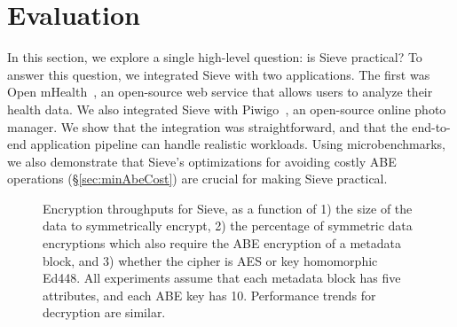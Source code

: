 \chapter{Evaluation}
\label{sec:evaluation}

In this section, we explore a single
high-level question: is Sieve practical?
To answer this question, we integrated
Sieve with two applications. The first
was Open mHealth~\cite{omh}, an open-source
web service that allows users to analyze
their health data. We also integrated Sieve
with Piwigo~\cite{piwigo}, an open-source
online photo manager. We show that the
integration was straightforward, and that
the end-to-end application pipeline can
handle realistic workloads. Using
microbenchmarks, we also demonstrate that
Sieve's optimizations for avoiding costly
ABE operations (\S\ref{sec:minAbeCost})
are crucial for making Sieve practical.

\begin{figure}
\centering
    \caption[ABE throughputs for Sieve]{Encryption throughputs for Sieve, as a function of 1) the size of
             the data to symmetrically encrypt, 2) the percentage of symmetric
             data encryptions which also require the ABE encryption of a
             metadata block, and 3) whether the cipher is AES or
             key homomorphic Ed448. All experiments assume that each metadata
             block has five attributes, and each ABE key has 10. Performance
             trends for decryption are similar.}
\label{fig:throughput}
\end{figure}

